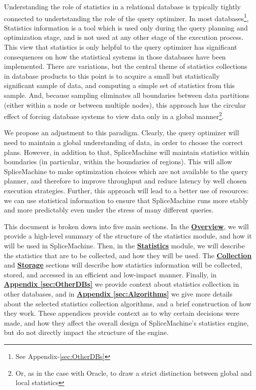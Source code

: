 Understanding the role of statistics in a relational database is typically tightly connected to undertstanding the role of the query optimizer. In most databases\footnote{See Appendix-\ref{sec:OtherDBs}}, Statistics information is a tool which is used only during the query planning and optimization stage, and is not used at any other stage of the execution process. This view that statistics is only helpful to the query optimizer has significant consequences on how the statistical systems in those databases have been implemented. There are variations, but the central theme of statistics collections in database products to this point is to acquire a small but statistically significant sample of data, and computing a simple set of statistics from this sample. And, because sampling eliminates all boundaries between data partitions (either within a node or between multiple nodes), this approach has the circular effect of forcing database systems to view data only in a global manner\footnote{Or, as in the case with Oracle, to draw a strict distinction between global and local statistics}.

We propose an adjustment to this paradigm. Clearly, the query optimizer will need to maintain a global understanding of data, in order to choose the correct plans. However, in addition to that, SpliceMachine will maintain statistics within boundaries (in particular, within the boundaries of regions). This will allow SpliceMachine to make optimization choices which are not available to the query planner, and therefore to improve throughput and reduce latency by well chosen execution strategies. Further, this approach will lead to a better use of resources: we can use statistical information to ensure that SpliceMachine runs more stably and more predictably even under the stress of many different queries.

This document is broken down into five main sections. In the \hyperref[sec:Overview]{\textbf{Overview}}, we will provide a high-level summary of the structure of the statistics module, and how it will be used in SpliceMachine. Then, in the \hyperref[sec:Statistics]{\textbf{Statistics}} module, we will describe the statistics that are to be collected, and how they will be used. The \hyperref[sec:Collection]{\textbf{Collection}} and \hyperref[sec:Storage]{\textbf{Storage}} sections will describe how statistics information will be collected, stored, and accessed in an efficient and low-impact manner. Finally, in \hyperref[sec:OtherDBs]{\textbf{Appendix \ref{sec:OtherDBs}}} we provide context about statistics collection in other databases, and in \hyperref[sec:Algorithms]{\textbf{Appendix \ref{sec:Algorithms}}} we give more details about the selected statistics collection algorithms, and a brief construction of how they work. These appendices provide context as to why certain decisions were made, and how they affect the overall design of SpliceMachine's statistics engine, but do not directly impact the structure of the engine.

